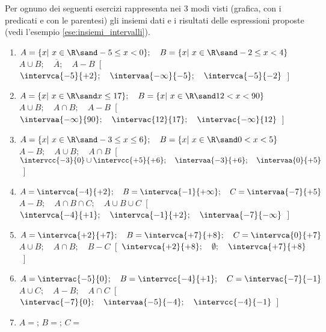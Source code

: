\begin{esercizio}
\label{ese:}
Per ognuno dei seguenti esercizi rappresenta nei 3 modi visti 
(grafica, con i predicati e con le parentesi) 
gli insiemi dati e i risultati delle espressioni proposte
(vedi l'esempio \ref{ese:insiemi_intervalli}).
\begin{enumerate}[label=\alph*)]
\item \(A=\{x|~x \in \R \sand -5 \le x < 0\}; \quad 
        B=\{x|~x \in \R \sand -2 \le x < 4\}\)\\
        \(A \cup B; \quad \overline{A}; \quad A-B\)\
\hfill [~\(\intervca{-5}{+2}; \quad \intervaa{-\infty}{-5}; \quad
\intervca{-5}{-2}\)~]
\item \(A=\{x|~x \in \R \sand  x \le 17\}; \quad 
        B=\{x|~x \in \R \sand  12 < x < 90\}\)\\
        \(A \cup B; \quad A \cap B; \quad A-B\)\
\hfill [~\(\intervaa{-\infty}{90}; \quad \intervac{12}{17}; \quad
\intervac{-\infty}{12}\)~]
\item \(A=\{x|~x \in \R \sand -3 \le x \le 6\}; \quad 
        B=\{x|~x \in \R \sand  0 < x < 5\}\)\\
        \(A-B; \quad A \cup B; \quad A \cap B\)\
\hfill [~\(\intervcc{-3}{0} \cup \intervcc{+5}{+6}; \quad 
\intervaa{-3}{+6}; \quad
\intervaa{0}{+5}\)~]
\item \(A=\intervca{-4}{+2}; \quad 
        B=\intervca{-1}{+\infty}; \quad 
        C=\intervaa{-7}{+5}\)\\
        \(A-B; \quad A \cap B \cap C; \quad A \cup B \cup C\)\
\hfill [~\(\intervca{-4}{+1}; \quad \intervca{-1}{+2}; \quad
\intervaa{-7}{-\infty}\)~]
\item \(A=\intervca{+2}{+7}; \quad 
        B=\intervca{+7}{+8}; \quad 
        C=\intervca{0}{+7}\)\\
        \(A \cup B; \quad A \cap B; \quad B-C\)\
\hfill [~\(\intervca{+2}{+8}; \quad \emptyset; \quad
\intervca{+7}{+8}\)~]
\item \(A=\intervac{-5}{0}; \quad 
        B=\intervcc{-4}{+1}; \quad 
        C=\intervac{-7}{-1}\)\\
        \(A \cup C; \quad A-B; \quad A \cap C\)\
\hfill [~\(\intervac{-7}{0}; \quad \intervaa{-5}{-4}; \quad
\intervcc{-4}{-1}\)~]
\item 
\(A=\); 
\quad
\(B=\); 
\quad
\(C=\)\\

\end{enumerate}
\end{esercizio}
